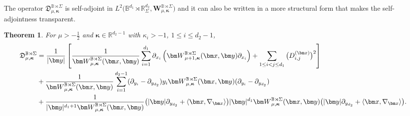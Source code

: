 \documentclass{amsart}
\newtheorem{thm}{Theorem}[section]
\theoremstyle{remark}
\def\la{{\langle}}
\def\ra{{\rangle}}
\def\fD{{\mathfrak D}}
\def\k{{\kappa}}
\def\la{{\langle}}
\def\ra{{\rangle}}
\def\xb{{\bm x}}
\def\yb{{\bm y}}
\def\Wb{{\bm W}}
\def\BB{{\mathbb B}}
\def\RR{{\mathbb R}}
\def\bk{{\boldsymbol{\kappa}}}
\def\f{\frac}
\begin{document}
 The operator $\fD_{\mu,\bk}^{\BB\rtimes \Sigma}$ is self-adjoint in 
 $L^2\big(\BB^{d_1} \rtimes \RR_\Sigma^{d_2}, \bm W_{\mu, \bk}^{\BB\rtimes \Sigma}\big)$ and it can also be written 
 in a more structural form that makes the self-adjointness transparent. 

\begin{thm} \label{thm:self-adjBS}
For $\mu > -\f12$ and $\bk \in \RR^{d_2-1}$ with $\k_i > -1$, $1 \le i \le d_2-1$,
\begin{align*} %
  \fD_{\mu,\bk}^{\BB\rtimes \Sigma} & = \frac{1}{|\yb|} \left[ \frac{1}{\Wb_{\mu,\bk}^{\BB\rtimes \Sigma} (\xb,\yb)}
    \sum_{i=1}^{d_1} \partial_{x_i} \left(\Wb_{\mu+1,\bk}^{\BB\rtimes \Sigma} (\xb,\yb) \partial_{x_i} \right)  
     + \sum_{1 \le i < j \le d_1} \big( D_{i,j}^{(\xb)} \big)^2 \right]\\
   & +  \frac{1}{\Wb_{\mu,\bk}^{\BB\rtimes \Sigma} (\xb,\yb)} \sum_{i=1}^{d_2-1} (\partial_{y_i} - \partial_{y_{d_2}})
       y_i  \Wb_{\mu,\bk}^{\BB\rtimes \Sigma} (\xb,\yb) (\partial_{y_i} - \partial_{y_{d_2}}) \notag \\
  & +  \frac{1}{|\yb|^{d_1+1} \Wb_{\mu,\bk}^{\BB\rtimes \Sigma} (\xb,\yb)} 
         \big(|\yb| \partial_{y_{d_2}} +\la \xb, \nabla_{\xb}\ra \big) |\yb|^{d_1}
              \Wb_{\mu,\bk}^{\BB\rtimes \Sigma} (\xb,\yb) \big(|\yb| \partial_{y_{d_2}} + \la \xb, \nabla_{\xb}\ra \big). \notag
\end{align*}
\end{thm}
\end{document}
